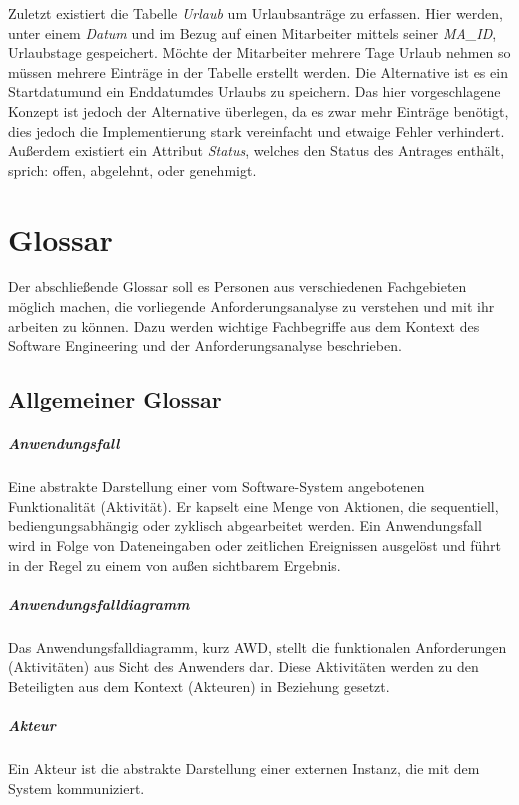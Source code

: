 Zuletzt existiert die Tabelle \textit{Urlaub} um Urlaubsanträge zu erfassen.
Hier werden, unter einem \textit{Datum} und im Bezug auf einen Mitarbeiter mittels seiner \textit{MA\_ID}, Urlaubstage gespeichert.
Möchte der Mitarbeiter mehrere Tage Urlaub nehmen so müssen mehrere Einträge in der Tabelle erstellt werden.
Die Alternative ist es ein \glqq Startdatum\grqq und ein \glqq Enddatum\grqq des Urlaubs zu speichern.
Das hier vorgeschlagene Konzept ist jedoch der Alternative überlegen, da es zwar mehr Einträge benötigt, dies jedoch die Implementierung stark vereinfacht und etwaige Fehler verhindert.
Außerdem existiert ein Attribut \textit{Status}, welches den Status des Antrages enthält, sprich: \glqq offen\grqq, \glqq abgelehnt\grqq, oder \glqq genehmigt\grqq.

\newpage

\chapter{Glossar}
Der abschlie{\ss}ende Glossar soll es Personen aus verschiedenen Fachgebieten möglich machen, die vorliegende Anforderungsanalyse zu verstehen und mit ihr arbeiten zu können. Dazu werden wichtige Fachbegriffe aus dem Kontext des Software Engineering und der Anforderungsanalyse beschrieben.

\section{Allgemeiner Glossar}
\paragraph{Anwendungsfall}
Eine abstrakte Darstellung einer vom Software-System angebotenen Funktionalität (Aktivität). Er kapselt eine Menge von Aktionen, die sequentiell, bediengungsabhängig oder zyklisch abgearbeitet werden. Ein Anwendungsfall wird in Folge von Dateneingaben oder zeitlichen Ereignissen ausgelöst und führt in der Regel zu einem von au{\ss}en sichtbarem Ergebnis.

\paragraph{Anwendungsfalldiagramm}
Das Anwendungsfalldiagramm, kurz AWD, stellt die funktionalen Anforderungen (Aktivitäten) aus Sicht des Anwenders dar. Diese Aktivitäten werden zu den Beteiligten aus dem Kontext (Akteuren) in Beziehung gesetzt.

\paragraph{Akteur}
Ein Akteur ist die abstrakte Darstellung einer externen Instanz, die mit dem System kommuniziert.


